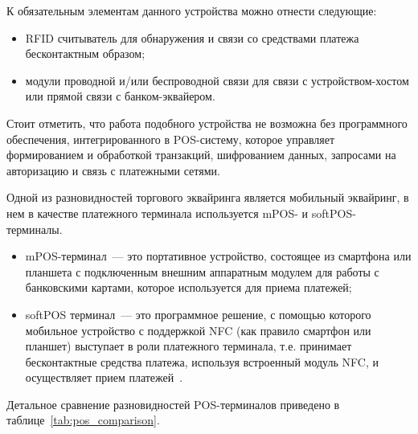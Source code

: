 К обязательным элементам данного устройства можно отнести следующие:

\begin{itemize}
    \item RFID считыватель для обнаружения и связи со средствами платежа бесконтактным образом;
    \item модули проводной и/или беспроводной связи для связи с устройством-хостом или прямой связи с банком-эквайером.
\end{itemize}

Стоит отметить, что работа подобного устройства не возможна без программного обеспечения, интегрированного в POS-систему, которое управляет формированием и обработкой транзакций, шифрованием данных, запросами на авторизацию и связь с платежными сетями.

Одной из разновидностей торгового эквайринга является мобильный эквайринг, в нем в качестве платежного терминала используется mPOS- и softPOS-терминалы.

\begin{itemize}
    \item mPOS-терминал~--- это портативное устройство, состоящее из смартфона или планшета с подключенным внешним аппаратным модулем для работы с банковскими картами, которое используется для приема платежей;
    \item softPOS терминал~--- это программное решение, с помощью которого мобильное устройство с поддержкой NFC (как правило смартфон или планшет) выступает в роли платежного терминала, т.е. принимает бесконтактные средства платежа, используя встроенный модуль NFC, и осуществляет прием платежей~\cite{pos_term}.
\end{itemize}

Детальное сравнение разновидностей POS-терминалов приведено в таблице~\ref{tab:pos_comparison}.

